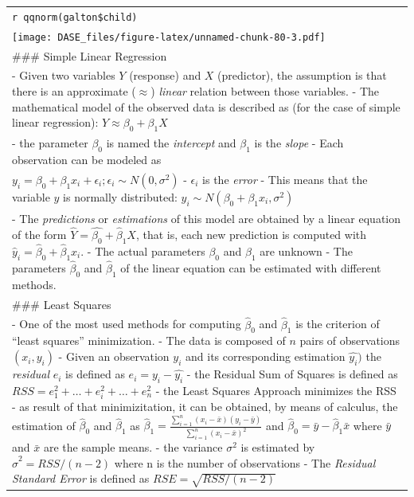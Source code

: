 \documentclass[
]{book}
\begin{document}
\begin{longtable}[]{@{}
  >{\raggedleft\arraybackslash}p{}@{}}
\texttt{r\ qqnorm(galton\$child)} \\
\texttt{[image: DASE\_files/figure-latex/unnamed-chunk-80-3.pdf]} \\
\#\#\# Simple Linear Regression \\
- Given two variables \(Y\) (response) and \(X\) (predictor), the assumption is that there is an approximate (\(\approx\)) \emph{linear} relation between those variables.
- The mathematical model of the observed data is described as (for the case of simple linear regression):
\( Y \approx \beta_0 + \beta_1 X\) \\
- the parameter \(\beta_0\) is named the \emph{intercept} and \(\beta_1\) is the \emph{slope}
- Each observation can be modeled as \\
\(y_i = \beta_0 + \beta_1 x_i + \epsilon_i;
\epsilon_i \sim N(0,\sigma^2)\)
- \(\epsilon_i\) is the \emph{error}
- This means that the variable \(y\) is normally distributed:
\( y_i \sim N( \beta_0 + \beta_1 x_i, \sigma^2) \) \\
- The \emph{predictions} or \emph{estimations} of this model are obtained by a linear equation of the form \(\hat{Y}=\hat{\beta_0} + \hat{\beta}_1X\), that is, each new prediction is computed with
\(\hat{y}_i = \hat{\beta}_0 + \hat{\beta}_1x_i \).
- The actual parameters \(\beta_0\) and \(\beta_1\) are unknown
- The parameters \(\hat{\beta}_0\) and \(\hat{\beta}_1\) of the linear equation can be estimated with different methods. \\
\#\#\# Least Squares \\
- One of the most used methods for computing \(\hat{\beta}_0\) and \(\hat{\beta}_1\) is the criterion of ``least squares'' minimization.
- The data is composed of \(n\) pairs of observations \((x_i, y_i)\)
- Given an observation \(y_i\) and its corresponding estimation \(\hat{y_i})\) the \emph{residual} \(e_i\) is defined as \(e_i= y_i - \hat{y_i}\)
- the Residual Sum of Squares is defined as \(RSS=e_1^2+\dots + e_i^2+\dots+e_n^2\)
- the Least Squares Approach minimizes the RSS
- as result of that minimizitation, it can be obtained, by means of calculus, the estimation of \(\hat{\beta}_0\) and \(\hat{\beta}_1\) as \(\hat{\beta}_1=\frac{\sum_{i=1}^{n}{(x_i-\bar{x})(y_i-\bar{y})}}{\sum_{i=1}^{n}(x_i-\bar{x})^2}\) and \(\hat{\beta}_0=\bar{y}-\hat{\beta}_1\bar{x} \) where \(\bar{y}\) and \(\bar{x}\) are the sample means.
- the variance \(\sigma^2\) is estimated by
\(\hat\sigma^2 = {RSS}/{(n-2)}\) where n is the number of observations
- The \emph{Residual Standard Error} is defined as \(RSE = \sqrt{{RSS}/{(n-2)}}\)

\end{longtable}
\end{document}
